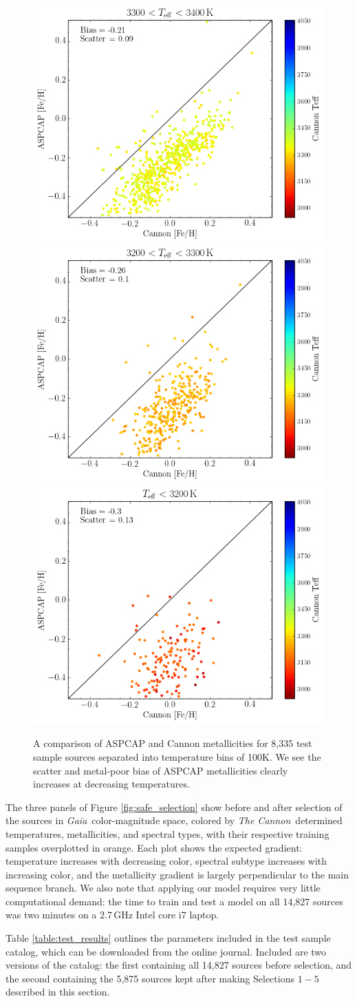 \documentclass[twocolumn]{aastex62}
\newcommand{\thecannon}{\textsl{The Cannon}}
\newcommand{\gaia}{\textsl{Gaia}}
\begin{document}
\begin{figure}
\begin{center}
	\includegraphics[width=.3\linewidth]{figures/met_comp7.png}
	\includegraphics[width=.3\linewidth]{figures/met_comp8.png}
	\includegraphics[width=.3\linewidth]{figures/met_comp9.png} 
	\caption{A comparison of ASPCAP and Cannon metallicities for 8,335 test sample sources separated into temperature bins of 100K. We see the scatter and metal-poor bias of ASPCAP metallicities clearly increases at decreasing temperatures.} 
	\label{fig:met_comp}
\end{center}
\end{figure}


The three panels of Figure \ref{fig:safe_selection} show before and after selection of the sources in \gaia\ color-magnitude space, colored by \thecannon\ determined temperatures, metallicities, and spectral types, with their respective training samples overplotted in orange. Each plot shows the expected gradient: temperature increases with decreasing color, spectral subtype increases with increasing color, and the metallicity gradient is largely perpendicular to the main sequence branch. 
We also note that applying our model requires very little computational demand: the time to train and test a model on all 14,827 sources was two minutes on a 2.7\,GHz Intel core i7 laptop. 

Table \ref{table:test_results} outlines the parameters included in the test sample catalog, which can be downloaded from the online journal. Included are two versions of the catalog: the first containing all 14,827 sources before selection, and the second containing the 5,875 sources kept after making Selections $1-5$ described in this section.
\end{document}

